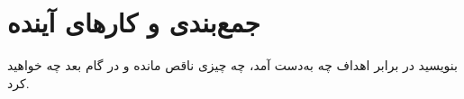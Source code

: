 \section{جمع‌بندی و کارهای آینده}

بنویسید در برابر اهداف چه به‌دست آمد، چه چیزی ناقص مانده و در گام بعد چه خواهید کرد.
